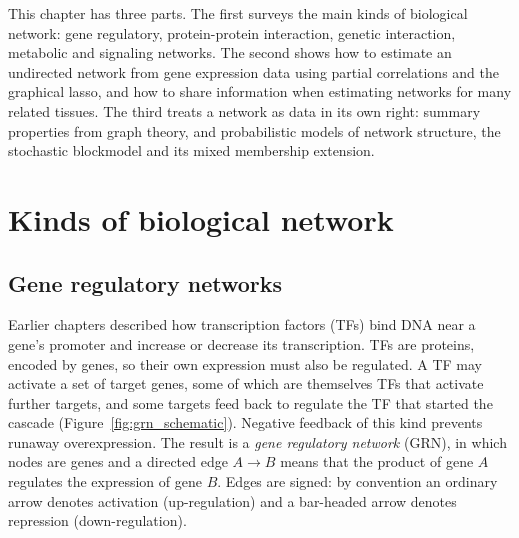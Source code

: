 This chapter has three parts. The first surveys the main kinds of biological network: gene regulatory, protein-protein interaction, genetic interaction, metabolic and signaling networks. The second shows how to estimate an undirected network from gene expression data using partial correlations and the graphical lasso, and how to share information when estimating networks for many related tissues. The third treats a network as data in its own right: summary properties from graph theory, and probabilistic models of network structure, the stochastic blockmodel and its mixed membership extension.

\section{Kinds of biological network}
\label{sec:network_types}

\subsection{Gene regulatory networks}

Earlier chapters described how transcription factors (TFs) bind DNA near a gene's promoter and increase or decrease its transcription. TFs are proteins, encoded by genes, so their own expression must also be regulated. A TF may activate a set of target genes, some of which are themselves TFs that activate further targets, and some targets feed back to regulate the TF that started the cascade (Figure~\ref{fig:grn_schematic}). Negative feedback of this kind prevents runaway overexpression. The result is a \emph{gene regulatory network} (GRN), in which nodes are genes and a directed edge $A\to B$ means that the product of gene $A$ regulates the expression of gene $B$. Edges are signed: by convention an ordinary arrow denotes activation (up-regulation) and a bar-headed arrow denotes repression (down-regulation).

